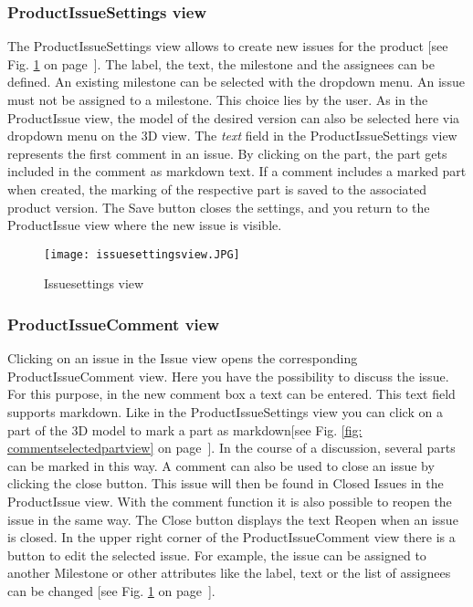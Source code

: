 \subsubsection*{ProductIssueSettings view}

The ProductIssueSettings view allows to create new issues for the product [see Fig. \ref{fig: issuesettingsview} on page~\pageref{fig: issuesettingsview}]. The label, the text, the milestone and the assignees can be defined. An existing milestone can be selected with the dropdown menu. An issue must not be assigned to a milestone. This choice lies by the user. 
As in the ProductIssue view, the model of the desired version can also be selected here via dropdown menu on the 3D view.
The \textit{text} field in the ProductIssueSettings view represents the first comment in an issue. By clicking on the part, the part gets included in the comment as markdown text. If a comment includes a marked part when created, the marking of the respective part is saved to the associated product version.
The Save button closes the settings, and you return to the ProductIssue view where the new issue is visible.

\begin{figure}[h]
    \centering
    \texttt{[image: issuesettingsview.JPG]}
    \caption{Issuesettings view}
    \label{fig: issuesettingsview}
\end{figure}

\subsubsection*{ProductIssueComment view}

Clicking on an issue in the Issue view opens the corresponding ProductIssueComment view.  Here you have the possibility to discuss the issue. 
For this purpose, in the new comment box a text can be entered. This text field supports markdown.
Like in the ProductIssueSettings view you can click on a part of the 3D model to mark a part as markdown[see Fig. \ref{fig: commentselectedpartview} on page~\pageref{fig: commentselectedpartview}]. In the course of a discussion, several parts can be marked in this way.
A comment can also be used to close an issue by clicking the close button. This issue will then be found in Closed Issues in the ProductIssue view. With the comment function it is also possible to reopen the issue in the same way. The Close button displays the text Reopen when an issue is closed. In the upper right corner of the ProductIssueComment view there is a button to edit the selected issue. For example, the issue can be assigned to another Milestone or other attributes like the label, text or the list of assignees can be changed [see Fig. \ref{fig: issuesettingsview} on page~\pageref{fig: issuesettingsview}].

